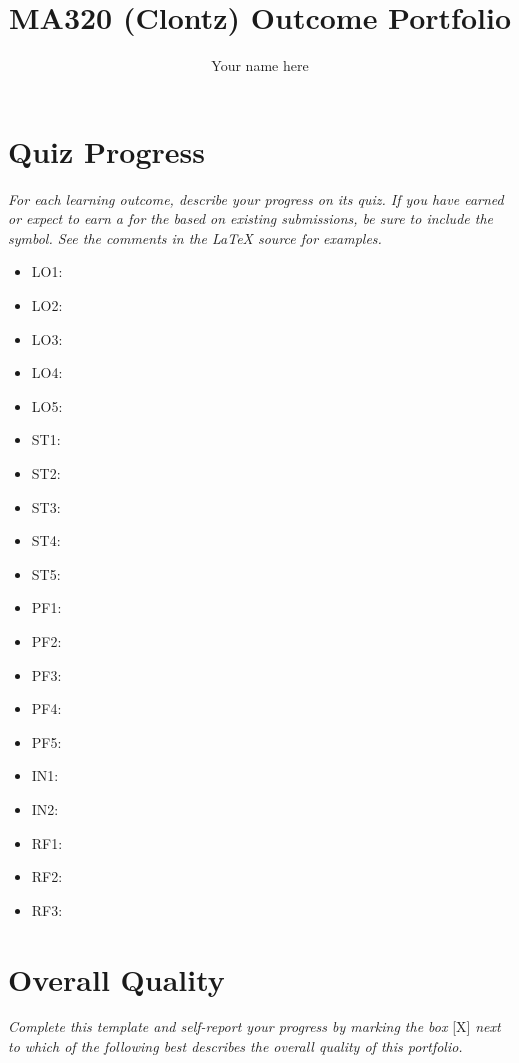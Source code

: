\documentclass{article}
\title{MA320 (Clontz) Outcome Portfolio}
\author{Your name here}
\begin{document}
\maketitle

\section{Quiz Progress}
\textit{For each learning outcome, describe your progress on
its quiz. If you have earned or expect to earn a \checkmark for the
based on existing submissions, be sure to include the \checkmark symbol.
See the comments in the LaTeX source for examples.}


\begin{itemize}
\item LO1:
\item LO2:
\item LO3:
\item LO4:
\item LO5:
\item ST1:
\item ST2:
\item ST3:
\item ST4:
\item ST5:
\item PF1:
\item PF2:
\item PF3:
\item PF4:
\item PF5:
\item IN1:
\item IN2:
\item RF1:
\item RF2:
\item RF3:
\end{itemize}

\section{Overall Quality}
\textit{Complete this template and
self-report your progress by marking the box }[X]\textit{ next to
which of the following best describes the overall quality of
this portfolio.}
\end{document}
